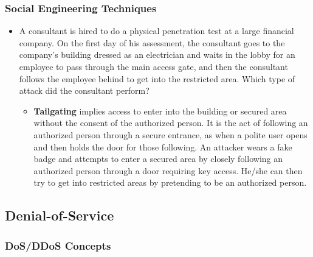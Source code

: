 \subsubsection{Social Engineering Techniques}
\begin{itemize}
    \item A consultant is hired to do a physical penetration test at a large financial company. On the first day of his assessment, the consultant goes to the company's building dressed as an electrician and waits in the lobby for an employee to pass through the main access gate, and then the consultant follows the employee behind to get into the restricted area. Which type of attack did the consultant perform?
    \begin{itemize}
        \item \textbf{Tailgating} implies access to enter into the building or secured area without the consent of the authorized person. It is the act of following an authorized person through a secure entrance, as when a polite user opens and then holds the door for those following. An attacker wears a fake badge and attempts to enter a secured area by closely following an authorized person through a door requiring key access. He/she can then try to get into restricted areas by pretending to be an authorized person.
    \end{itemize}
\end{itemize}


\subsection{Denial-of-Service}
\subsubsection{DoS/DDoS Concepts}
